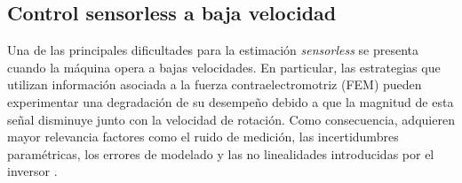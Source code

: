 \subsection{Control sensorless a baja velocidad}
%
%
%
%
%
%
%
%
%
%
%
%
%
%
%
%

Una de las principales dificultades para la estimación \textit{sensorless} se presenta cuando la máquina opera a bajas velocidades. En particular, las estrategias que utilizan información asociada a la fuerza contraelectromotriz (FEM) pueden experimentar una degradación de su desempeño debido a que la magnitud de esta señal disminuye junto con la velocidad de rotación. Como consecuencia, adquieren mayor relevancia factores como el ruido de medición, las incertidumbres paramétricas, los errores de modelado y las no linealidades introducidas por el inversor \cite{wangParameterRobustnessImprovement2026}.

